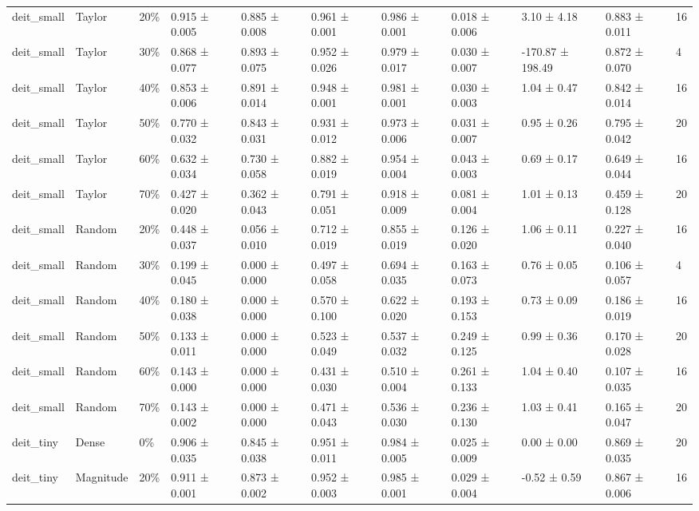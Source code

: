 \begin{table}[t]
\begin{tabular}{lllllllllll}
deit\_small & Taylor & 20\% & 0.915 ± 0.005 & 0.885 ± 0.008 & 0.961 ± 0.001 & 0.986 ± 0.001 & 0.018 ± 0.006 & 3.10 ± 4.18 & 0.883 ± 0.011 & 16 \\
deit\_small & Taylor & 30\% & 0.868 ± 0.077 & 0.893 ± 0.075 & 0.952 ± 0.026 & 0.979 ± 0.017 & 0.030 ± 0.007 & -170.87 ± 198.49 & 0.872 ± 0.070 & 4 \\
deit\_small & Taylor & 40\% & 0.853 ± 0.006 & 0.891 ± 0.014 & 0.948 ± 0.001 & 0.981 ± 0.001 & 0.030 ± 0.003 & 1.04 ± 0.47 & 0.842 ± 0.014 & 16 \\
deit\_small & Taylor & 50\% & 0.770 ± 0.032 & 0.843 ± 0.031 & 0.931 ± 0.012 & 0.973 ± 0.006 & 0.031 ± 0.007 & 0.95 ± 0.26 & 0.795 ± 0.042 & 20 \\
deit\_small & Taylor & 60\% & 0.632 ± 0.034 & 0.730 ± 0.058 & 0.882 ± 0.019 & 0.954 ± 0.004 & 0.043 ± 0.003 & 0.69 ± 0.17 & 0.649 ± 0.044 & 16 \\
deit\_small & Taylor & 70\% & 0.427 ± 0.020 & 0.362 ± 0.043 & 0.791 ± 0.051 & 0.918 ± 0.009 & 0.081 ± 0.004 & 1.01 ± 0.13 & 0.459 ± 0.128 & 20 \\
deit\_small & Random & 20\% & 0.448 ± 0.037 & 0.056 ± 0.010 & 0.712 ± 0.019 & 0.855 ± 0.019 & 0.126 ± 0.020 & 1.06 ± 0.11 & 0.227 ± 0.040 & 16 \\
deit\_small & Random & 30\% & 0.199 ± 0.045 & 0.000 ± 0.000 & 0.497 ± 0.058 & 0.694 ± 0.035 & 0.163 ± 0.073 & 0.76 ± 0.05 & 0.106 ± 0.057 & 4 \\
deit\_small & Random & 40\% & 0.180 ± 0.038 & 0.000 ± 0.000 & 0.570 ± 0.100 & 0.622 ± 0.020 & 0.193 ± 0.153 & 0.73 ± 0.09 & 0.186 ± 0.019 & 16 \\
deit\_small & Random & 50\% & 0.133 ± 0.011 & 0.000 ± 0.000 & 0.523 ± 0.049 & 0.537 ± 0.032 & 0.249 ± 0.125 & 0.99 ± 0.36 & 0.170 ± 0.028 & 20 \\
deit\_small & Random & 60\% & 0.143 ± 0.000 & 0.000 ± 0.000 & 0.431 ± 0.030 & 0.510 ± 0.004 & 0.261 ± 0.133 & 1.04 ± 0.40 & 0.107 ± 0.035 & 16 \\
deit\_small & Random & 70\% & 0.143 ± 0.002 & 0.000 ± 0.000 & 0.471 ± 0.043 & 0.536 ± 0.030 & 0.236 ± 0.130 & 1.03 ± 0.41 & 0.165 ± 0.047 & 20 \\
deit\_tiny & Dense & 0\% & 0.906 ± 0.035 & 0.845 ± 0.038 & 0.951 ± 0.011 & 0.984 ± 0.005 & 0.025 ± 0.009 & 0.00 ± 0.00 & 0.869 ± 0.035 & 20 \\
deit\_tiny & Magnitude & 20\% & 0.911 ± 0.001 & 0.873 ± 0.002 & 0.952 ± 0.003 & 0.985 ± 0.001 & 0.029 ± 0.004 & -0.52 ± 0.59 & 0.867 ± 0.006 & 16 \\

\end{tabular}
\end{table}
